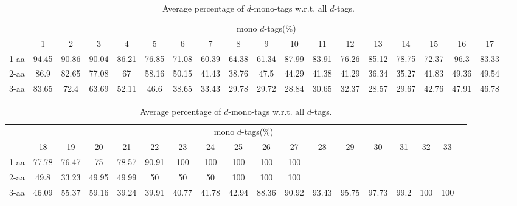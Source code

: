 \begin{table}[h]\tiny
\vspace{3mm}
{\centering
\begin{center}
\begin{tabular}{|l|c|c|c|c|c|c|c|c|c|c|c|c|c|c|c|c|c|c|}
  \hline
  & \multicolumn{ 17 }{|c|}{mono $d$-tags(\%)} \\
  \cline{2- 18}
    & 1 & 2 & 3 & 4 & 5 & 6 & 7 & 8 & 9 & 10 & 11 & 12 & 13 & 14 & 15 & 16 & 17\\
  \hline
1-aa  & 94.45 & 90.86 & 90.04 & 86.21 & 76.85 & 71.08 & 60.39 & 64.38 & 61.34 & 87.99 & 83.91 & 76.26 & 85.12 & 78.75 & 72.37 & 96.3 & 83.33\\
2-aa  & 86.9 & 82.65 & 77.08 & 67 & 58.16 & 50.15 & 41.43 & 38.76 & 47.5 & 44.29 & 41.38 & 41.29 & 36.34 & 35.27 & 41.83 & 49.36 & 49.54\\
3-aa  & 83.65 & 72.4 & 63.69 & 52.11 & 46.6 & 38.65 & 33.43 & 29.78 & 29.72 & 28.84 & 30.65 & 32.37 & 28.57 & 29.67 & 42.76 & 47.91 & 46.78\\
 \hline
\end{tabular}
\end{center}
\par}
\centering
\caption{ Average percentage of $d$-mono-tags w.r.t. all $d$-tags.}
\vspace{3mm}
\label{table:mono-d-tags}
\end{table}
\begin{table}[h]\tiny
\vspace{3mm}
{\centering
\begin{center}
\begin{tabular}{|l|c|c|c|c|c|c|c|c|c|c|c|c|c|c|c|c|c|}
  \hline
  & \multicolumn{ 16 }{|c|}{mono $d$-tags(\%)} \\
  \cline{2- 17}
    & 18 & 19 & 20 & 21 & 22 & 23 & 24 & 25 & 26 & 27 & 28 & 29 & 30 & 31 & 32 & 33\\
  \hline
1-aa  & 77.78 & 76.47 & 75 & 78.57 & 90.91 & 100 & 100 & 100 & 100 & 100 &  &  &  &  &  & \\
2-aa  & 49.8 & 33.23 & 49.95 & 49.99 & 50 & 50 & 50 & 100 & 100 & 100 &  &  &  &  &  & \\
3-aa  & 46.09 & 55.37 & 59.16 & 39.24 & 39.91 & 40.77 & 41.78 & 42.94 & 88.36 & 90.92 & 93.43 & 95.75 & 97.73 & 99.2 & 100 & 100\\
 \hline
\end{tabular}
\end{center}
\par}
\centering
\caption{ Average percentage of $d$-mono-tags w.r.t. all $d$-tags.}
\vspace{3mm}
\label{table:mono-d-tags}
\end{table}
